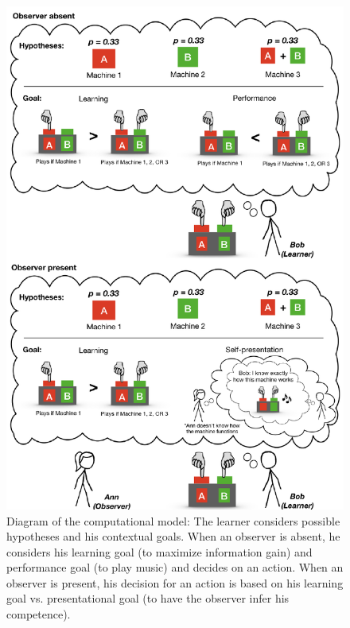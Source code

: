 \documentclass[10pt, letterpaper]{article}
\newenvironment{CodeChunk}{}{}
\begin{document}
\begin{CodeChunk}
\captionsetup{width=0.8\textwidth}\begin{figure}[h]

{\centering \includegraphics{figs/model_diagram-1} 

}

\caption[Diagram of the computational model]{Diagram of the computational model: The learner considers possible hypotheses and his contextual goals. When an observer is absent, he considers his learning goal (to maximize information gain) and performance goal (to play music) and decides on an action. When an observer is present, his decision for an action is based on his learning goal vs. presentational goal (to have the observer infer his competence).}\label{fig:model_diagram}
\end{figure}
\end{CodeChunk}
\end{document}
